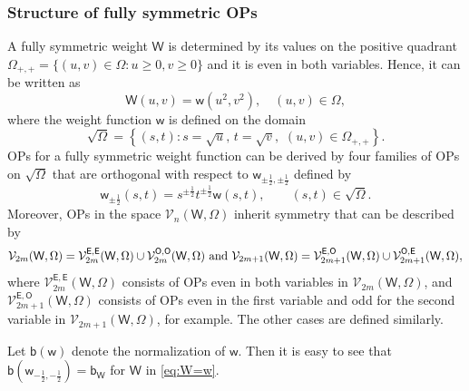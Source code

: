 \documentclass{amsart}
\theoremstyle{remark}
\def\sb{{\mathsf b}}
\def\sw{{\mathsf w}}
\def\sE{{\mathsf E}}
\def\sO{{\mathsf O}}
\def\sW{{\mathsf W}}
\def\CV{{\mathcal V}}
\def\f{\frac}
\begin{document}
\subsubsection{Structure of fully symmetric OPs}
A fully symmetric weight $\sW$ is determined by its values on the positive quadrant 
$\Omega_{+,+} = \{(u,v) \in \Omega: u \ge 0, v \ge 0\}$ and it is even in both variables. Hence, it can be written as 
\begin{equation} \label{eq:W=w}
  \sW(u,v) = \sw\left(u^2, v^2\right), \quad (u,v) \in \Omega,
\end{equation}
where the weight function $\sw$ is defined on the domain
\begin{equation} \label{eq:sqrtOmega}
   \sqrt{\Omega} = \left\{(s,t): s = \sqrt{u}, \, t= \sqrt{v},   \,\, (u,v) \in \Omega_{+,+} \right\}.  
\end{equation}
OPs for a fully symmetric weight function can be derived by four families of OPs on $\sqrt{\Omega}$ that 
are orthogonal with respect to $\sw_{\pm \f12, \pm \f12}$ defined by 
\begin{equation} \label{eq:w1212}
  \sw_{\pm \f12}(s,t) = s^{\pm \f12} t^{\pm \f12} \sw(s,t), \qquad (s,t) \in  \sqrt{\Omega}.
\end{equation}
Moreover, OPs in the space $\CV_n(\sW,\Omega)$ inherit symmetry that can be described by  
$$
  \CV_{2m}(\sW,\Omega) = \CV_{2m}^{\sE,\sE}(\sW,\Omega) \cup \CV_{2m}^{\sO,\sO}(\sW,\Omega) \,\, \hbox{and}\,\,
    \CV_{2m+1}(\sW,\Omega) = \CV_{2m+1}^{\sE,\sO} (\sW,\Omega)\cup \CV_{2m+1}^{\sO,\sE}(\sW,\Omega),
$$
where $\CV_{2m}^{\sE,\sE}(\sW,\Omega)$ consists of OPs even in both variables in $\CV_{2m}(\sW,\Omega)$, 
and $\CV_{2m+1}^{\sE,\sO}(\sW,\Omega)$ consists of OPs even in the first variable and odd for the second 
variable in $\CV_{2m+1}(\sW,\Omega)$, for example. The other cases are defined similarly.

Let $\sb(\sw)$ denote the normalization of $\sw$. Then it is easy to see that $\sb(\sw_{-\f12,-\f12}) = \sb_\sW$ for $\sW$
in \eqref{eq:W=w}. %
\end{document}
